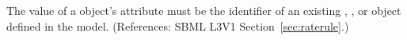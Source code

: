 The value of a \RateRule object's  attribute must be the
identifier of an existing \Species, \Compartment, \Parameter or
\SpeciesReference object defined in the model.  (References: SBML L3V1
Section~\ref{sec:raterule}.)
